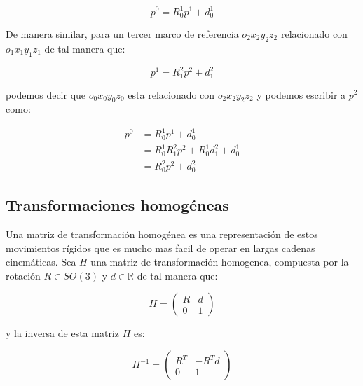 \begin{multicols*}{3}
            \begin{equation}
                p^0 = R_0^1 p^1 + d_0^1
            \end{equation}

            De manera similar, para un tercer marco de referencia $o_2 x_2 y_2 z_2$ relacionado con $o_1 x_1 y_1 z_1$ de tal manera que:

            \begin{equation*}
                p^1 = R_1^2 p^2 + d_1^2
            \end{equation*}

            podemos decir que $o_0 x_0 y_0 z_0$ esta relacionado con $o_2 x_2 y_2 z_2$ y podemos escribir a $p^2$ como:

            \begin{align*}
                p^0 &= R_0^1 p^1 + d_0^1 \\
                &= R_0^1 R_1^2 p^2 + R_0^1 d_1^2 + d_0^1 \\
                &= R_0^2 p^2 + d_0^2
            \end{align*}


        \subsection{Transformaciones homogéneas}

            Una matriz de transformación homogénea es una representación de estos movimientos rígidos que es mucho mas facil de operar en largas cadenas cinemáticas. Sea $H$ una matriz de transformación homogenea, compuesta por la rotación $R \in SO(3)$ y $d \in \mathbb{R}$ de tal manera que:

            \begin{equation}
                H =
                \begin{pmatrix}
                    R & d \\
                    0 & 1
                \end{pmatrix}
            \end{equation}

            y la inversa de esta matriz $H$ es:

            \begin{equation}
                H^{-1} =
                \begin{pmatrix}
                    R^T & -R^T d \\
                    0 & 1
                \end{pmatrix}
            \end{equation}


\end{multicols*}
